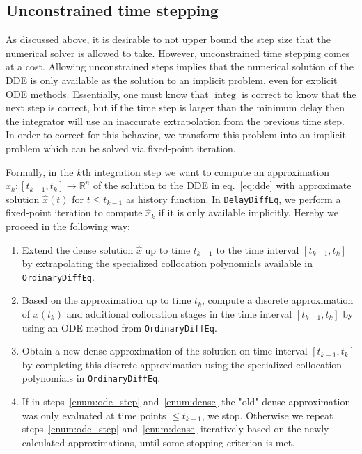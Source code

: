 \documentclass{juliacon}
\def\pkg#1{\texttt{#1}}
\begin{document}
\subsection{Unconstrained time stepping}\label{sec:unconstrained}

As discussed above, it is desirable to not upper bound the step size that
the numerical solver is allowed to take. However, unconstrained time stepping
comes at a cost. Allowing unconstrained steps implies that the numerical
solution of the DDE is only available as the solution to an implicit problem,
even for explicit ODE methods. Essentially, one must know that $\operatorname{integ}$ is correct to know that the next step is correct, but if
the time step is larger than the minimum delay then the integrator will use an inaccurate extrapolation from the previous time step.
In order to correct for this behavior, we transform this problem into an implicit problem which can be solved via fixed-point iteration.

Formally, in the $k$th integration step we want to compute an approximation
$\hat{x}_k \colon [t_{k - 1}, t_k] \to \mathbb{R}^n$ of the solution to the DDE
in eq.~\eqref{eq:dde} with approximate solution $\hat{x}(t)$ for $t \leq t_{k - 1}$ as history function.
In \pkg{DelayDiffEq}, we perform a fixed-point iteration to compute $\hat{x}_k$ if it is only available implicitly.
Hereby we proceed in the following way:

\begin{enumerate}
    \item \label{enum:extrapolation} Extend the dense solution $\hat{x}$ up to time $t_{k-1}$
    to the time interval $[t_{k-1}, t_k]$ by extrapolating the specialized
    collocation polynomials available in \pkg{OrdinaryDiffEq}.
    \item \label{enum:ode_step} Based on the approximation up to time $t_k$,
    compute a discrete approximation of $x(t_k)$ and additional
    collocation stages in the time interval $[t_{k - 1}, t_k]$ by using an ODE
    method from \pkg{OrdinaryDiffEq}.
    \item \label{enum:dense} Obtain a new dense approximation of the solution
    on time interval $[t_{k - 1}, t_k]$ by completing this discrete approximation
    using the specialized collocation polynomials in \pkg{OrdinaryDiffEq}.
    \item \label{enum:check} If in steps~\ref{enum:ode_step} and~\ref{enum:dense}
    the "old" dense approximation was only evaluated at time points $\leq t_{k - 1}$,
    we stop. Otherwise we repeat steps~\ref{enum:ode_step} and~\ref{enum:dense} iteratively based on the newly calculated approximations,
    until some stopping criterion is met.
\end{enumerate}
\end{document}
